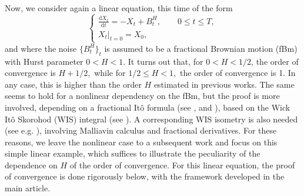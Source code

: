 \documentclass[reqno,12pt]{amsart}
\theoremstyle{plain} %
\theoremstyle{definition} %
\begin{document}
Now, we consider again a linear equation, this time of the form
\begin{equation}
    \label{linearnonhomogeneousfbm}
    \begin{cases}
        \displaystyle \frac{\mathrm{d}X_t}{\mathrm{d} t} = -X_t + B^H_t, \qquad 0 \leq t \leq T, \\
        \left. X_t \right|_{t = 0} = X_0,
      \end{cases}
\end{equation}
and where the noise $\{B^H_t\}_t$ is assumed to be a fractional Brownian motion (fBm) with Hurst parameter $0 < H < 1$. It turns out that, for $0 < H < 1/2$, the order of convergence is $H + 1/2,$ while for $1/2\leq H < 1,$ the order of convergence is 1. In any case, this is higher than the order $H$ estimated in previous works. The same seems to hold for a nonlinear dependency on the fBm, but the proof is more involved, depending on a fractional It\^o formula (see \cite[Theorem 4.2.6]{BHOB2008}, \cite[Theorem 4.1]{BENDER200381}and \cite[Theorem 2.7.4]{Mishura2008}), based on the Wick It\^o Skorohod (WIS) integral (see \cite[Chapter 4]{BHOB2008}). A corresponding WIS isometry is also needed (see e.g. \cite[Theorem 4.5.6]{BHOB2008}), involving Malliavin calculus and fractional derivatives. For these reasons, we leave the nonlinear case to a subsequent work and focus on this simple linear example, which suffices to illustrate the peculiarity of the dependence on $H$ of the order of convergence. For this linear equation, the proof of convergence is done rigorously below, with the framework developed in the main article.
\end{document}
